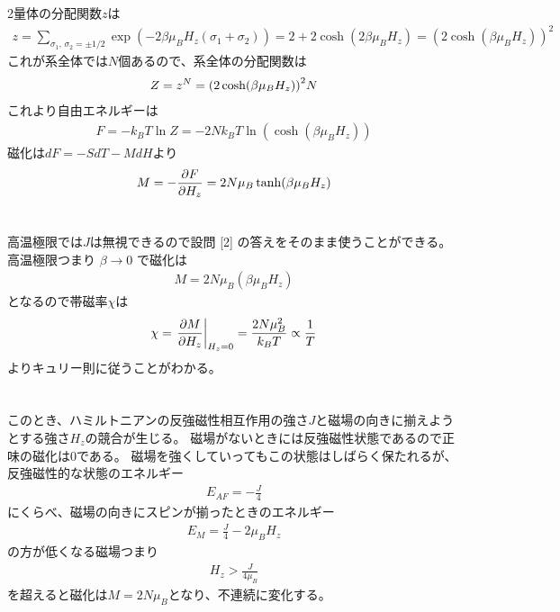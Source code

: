 \documentclass[../../master.tex]{subfiles}
\begin{document}
\section{}
2量体の分配関数\(z\)は
\begin{align}
    z = \sum_{\sigma_1,\,\sigma_2 = \pm 1/2}\exp(-2\beta\mu_B H_z(\sigma_1+\sigma_2))
    = 2 + 2\cosh(2\beta\mu_BH_z) = (2\cosh(\beta\mu_B H_z))^2
\end{align}
これが系全体では\(N\)個あるので、系全体の分配関数は
\begin{align}
    Z = z^N = \qty(2\cosh(\beta\mu_BH_z))^2N
\end{align}
これより自由エネルギーは
\begin{align}
    F = -k_BT \ln Z = -2Nk_B T \ln(\cosh(\beta\mu_BH_z))
\end{align}
磁化は\(dF = -SdT-MdH\)より
\begin{align}
    M = -\pdv{F}{H_z} = 2N\mu_B\tanh(\beta\mu_BH_z)
\end{align}

\section{}
高温極限では\(J\)は無視できるので設問 [2] の答えをそのまま使うことができる。
高温極限つまり \(\beta\to0\) で磁化は
\begin{align}
    M =2N\mu_B (\beta\mu_BH_z)
\end{align}
となるので帯磁率\(\chi\)は
\begin{align}
    \chi = \left.\pdv{M}{H_z}\right|_{H_z=0} = \frac{2N\mu_B^2}{k_BT} \propto \frac{1}{T}
\end{align}
よりキュリー則に従うことがわかる。

\section{}
このとき、ハミルトニアンの反強磁性相互作用の強さ\(J\)と磁場の向きに揃えようとする強さ\(H_z\)の競合が生じる。
磁場がないときには反強磁性状態であるので正味の磁化は\(0\)である。
磁場を強くしていってもこの状態はしばらく保たれるが、反強磁性的な状態のエネルギー
\begin{align}
    E_{AF} = -\frac{J}{4}
\end{align}
にくらべ、磁場の向きにスピンが揃ったときのエネルギー
\begin{align}
    E_{M} = \frac{J}{4}-2\mu_BH_z
\end{align}
の方が低くなる磁場つまり
\begin{align}
    H_z >\frac{J}{4\mu_B}
\end{align}
を超えると磁化は\(M = 2N\mu_B\)となり、不連続に変化する。
\end{document}
